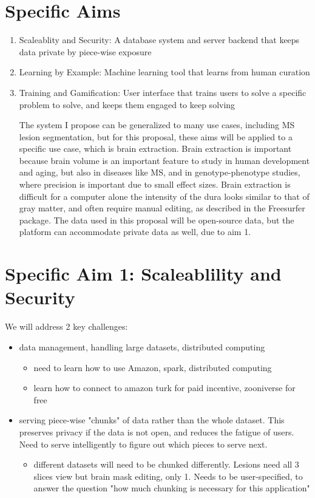 \section{Specific Aims}
\begin{enumerate}
\item Scaleablity and Security: A database system and server backend that keeps data private by piece-wise exposure
\item Learning by Example: Machine learning tool that learns from human curation
\item Training and Gamification: User interface that trains users to solve a specific problem to solve, and keeps them engaged to keep solving

The system I propose can be generalized to many use cases, including MS lesion segmentation, but for this proposal, these aims will be applied to a specific use case, which is brain extraction. Brain extraction is important because brain volume is an important feature to study in human development and aging, but also in diseases like MS, and in genotype-phenotype studies, where precision is important due to small effect sizes. Brain extraction is difficult for a computer alone the intensity of the dura looks similar to that of gray matter, and often require manual editing, as described in the Freesurfer package. The data used in this proposal will be open-source data, but the platform can accommodate private data as well, due to aim 1. 

\end{enumerate}

\section{Specific Aim 1: Scaleablility and Security}

We will address 2 key challenges:
\begin{itemize}
\item data management, handling large datasets, distributed computing 
\begin{itemize}
\item need to learn how to use Amazon, spark, distributed computing
\item learn how to connect to amazon turk for paid incentive, zooniverse for free
\end{itemize}
\item serving piece-wise "chunks" of data rather than the whole dataset. This preserves privacy if the data is not open, and reduces the fatigue of users. Need to serve intelligently to figure out which pieces to serve next.
\begin{itemize}
\item different datasets will need to be chunked differently. Lesions need all 3 slices view but brain mask editing, only 1. Needs to be user-specified, to answer the question "how much chunking is necessary for this application"
\end{itemize}
\end{itemize}

